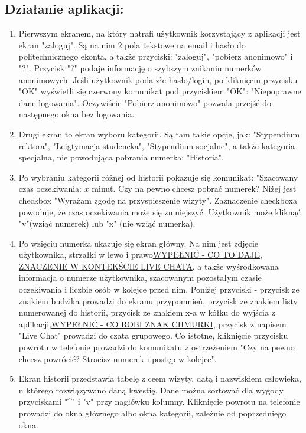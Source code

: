 \documentclass[12pt]{article}
\begin{document}
\subsection{Działanie aplikacji:}
\begin {enumerate}
	\item Pierwszym ekranem, na który natrafi użytkownik korzystający z aplikacji jest ekran "zaloguj". Są na nim 2 pola tekstowe na email i hasło do politechnicznego ekonta, a także przyciski: "zaloguj", "pobierz anonimowo" i "?". Przycisk "?" podaje informację o szybszym znikaniu numerków anonimowych. Jeśli użytkownik poda złe hasło/login, po kliknięciu przycisku "OK" wyświetli się czerwony komunikat pod przyciskiem "OK": "Niepoprawne dane logowania". Oczywiście "Pobierz anonimowo" pozwala przejść do następnego okna bez logowania.
	
	\item Drugi ekran to ekran wyboru kategorii. Są tam takie opcje, jak: "Stypendium rektora", "Leigtymacja studencka", "Stypendium socjalne", a także kategoria specjalna, nie powodująca pobrania numerka: "Historia".
	
	\item Po wybraniu kategorii różnej od historii pokazuje się komunikat: "Szacowany czas oczekiwania: ${x}$ minut. Czy na pewno chcesz pobrać numerek? Niżej jest checkbox "Wyrażam zgodę na przyspieszenie wizyty". Zaznaczenie checkboxa powoduje, że czas oczekiwania może się zmniejszyć. Użytkownik może kliknąć "v"(wziąć numerek) lub "x" (nie wziąć numerka).
	
	\item Po wzięciu numerka ukazuje się ekran główny. Na nim jest zdjęcie użytkownika, strzałki w lewo i prawo\underline{WYPEŁNIĆ - CO TO DAJE, ZNACZENIE W KONTEKŚCIE LIVE CHATA}, a także wyśrodkowana informacja o numerze użytkownika, szacowanym pozostałym czasie oczekiwania i liczbie osób w kolejce przed nim. Poniżej przyciski - przycisk ze znakiem budzika prowadzi do ekranu przypomnień, przycisk ze znakiem listy numerowanej do historii, przycisk ze znakiem x-a w kółku do wyjścia z aplikacji,\underline{WYPEŁNIĆ - CO ROBI ZNAK CHMURKI}, przycisk z napisem "Live Chat" prowadzi do czata grupowego. Co istotne, kliknięcie przycisku powrotu w telefonie prowadzi do komunikatu z ostrzeżeniem "Czy na pewno chcesz powrócić? Stracisz numerek i postęp w kolejce".
	
	\item Ekran historii przedstawia tabelę z ceem wizyty, datą i nazwiskiem człowieka, u którego rozwiązywano daną kwestię. Dane można sortować dla wygody przyciskami "\^{}" i "v" przy nagłówku kolumny. Kliknięcie powrotu na telefonie prowadzi do okna głównego albo okna kategorii, zależnie od poprzedniego okna.
	

\end{enumerate}
\end{document}

